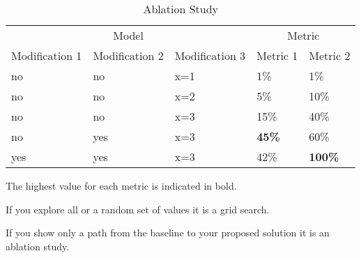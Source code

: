 \begin{table}[htbp]
    \centering
    \begin{threeparttable}
        \caption[Short Title for List of Table]{Ablation Study}
        \label{tab:results:ablation}
        \begin{tabular}{@{}lllll@{}}
            \toprule
             \multicolumn{3}{c}{Model} & \multicolumn{2}{c}{Metric} \\
            Modification 1  & Modification 2 & Modification 3 & Metric 1 & Metric 2\\ %
             \cmidrule(lr){1-3} \cmidrule(lr){4-5}
            no     & no        & x=1    & 1\%  & 1\%    \\
            no     & no        & x=2    & 5\%  & 10\%    \\
            no     & no        & x=3    & 15\%  & 40\%    \\
            no     & yes       & x=3    & \textbf{45\%}  & 60\%    \\
            yes    & yes        & x=3    & 42\%  &\textbf{100\%}    \\
            \bottomrule
        \end{tabular}
        \begin{tablenotes}
            \small
            \item The highest value for each metric is indicated in bold.
            \item If you explore all or a random set of values it is a grid search.
            \item If you show only a path from the baseline to your proposed solution it is an ablation study.
        \end{tablenotes}
    \end{threeparttable}
\end{table}

